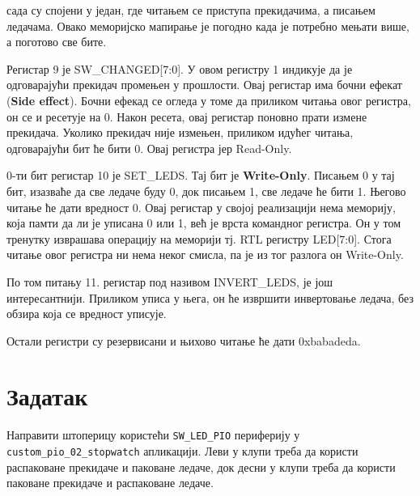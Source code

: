 \documentclass[12pt]{article}
\begin{document}
сада су спојени у један,
где читањем се приступа прекидачима,
а писањем ледачама.
Овако меморијско мапирање је погодно када је потребно мењати више,
а поготово све бите.
\par
Регистар 9 је SW\_CHANGED[7:0].
У овом регистру 1 индикује да је одговарајући прекидач промењен у прошлости.
Овај регистар има бочни ефекат (\textbf{Side effect}).
Бочни ефекад се огледа у томе да приликом читања овог регистра,
он се и ресетује на 0.
Након ресета, овај регистар поновно прати измене прекидача.
Уколико прекидач није измењен, приликом идућег читања,
одговарајући бит ће бити 0.
Овај регистра јер Read-Only.
\par
0-ти бит регистар 10 је SET\_LEDS.
Тај бит је \textbf{Write-Only}.
Писањем 0 у тај бит, изазваће да све ледаче буду 0,
док писањем 1, све ледаче ће бити 1.
Његово читање ће дати вредност 0.
Овај регистар у својој реализацији нема меморију,
која памти да ли је уписана 0 или 1,
већ је врста командног регистра.
Он у том тренутку изврашава операцију
на меморији тј. RTL регистру LED[7:0].
Стога читање овог регистра ни нема неког смисла,
па је из тог разлога он Write-Only.
\par
По том питању 11. регистар под називом INVERT\_LEDS,
је још интересантнији.
Приликом уписа у њега,
он ће извршити инвертовање ледача,
без обзира која се вредност уписује.
\par
Остали регистри су резервисани и њихово читање ће дати 0xbabadeda.


\section{Задатак}
\par
Направити штоперицу користећи \verb|SW_LED_PIO| периферију
у \verb|custom_pio_02_stopwatch| апликацији.
Леви у клупи треба да користи распаковане прекидаче и паковане ледаче,
док десни у клупи треба да користи паковане прекидаче и распаковане ледаче.





%

\end{document}
